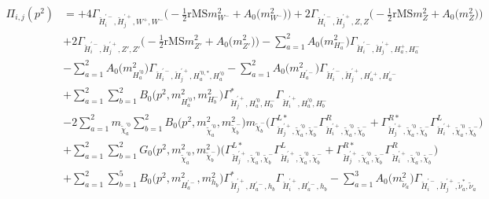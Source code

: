 \begin{itemize}
\begin{align} 
\Pi_{i,j}(p^2) &= +4 {\Gamma_{\check{H}^{'-}_{{i}},\check{H}^{'+}_{{j}},W^+,W^-}} \Big(-\frac{1}{2} \text{rMS} m^2_{W^-}  + {A_0\Big(m^2_{W^-}\Big)}\Big)+2 {\Gamma_{\check{H}^{'-}_{{i}},\check{H}^{'+}_{{j}},Z,Z}} \Big(-\frac{1}{2} \text{rMS} m^2_{Z}  + {A_0\Big(m^2_{Z}\Big)}\Big)\nonumber \\ 
 &+2 {\Gamma_{\check{H}^{'-}_{{i}},\check{H}^{'+}_{{j}},{Z'},{Z'}}} \Big(-\frac{1}{2} \text{rMS} m^2_{{Z'}}  + {A_0\Big(m^2_{{Z'}}\Big)}\Big)- \sum_{a=1}^{2}{A_0\Big(m^2_{H^-_{{a}}}\Big)} {\Gamma_{\check{H}^{'-}_{{i}},\check{H}^{'+}_{{j}},H^+_{{a}},H^-_{{a}}}}  \nonumber \\ 
 &- \sum_{a=1}^{2}{A_0\Big(m^2_{H^{'0}_{{a}}}\Big)} {\Gamma_{\check{H}^{'-}_{{i}},\check{H}^{'+}_{{j}},H^{{'0},*}_{{a}},H^{'0}_{{a}}}}  - \sum_{a=1}^{2}{A_0\Big(m^2_{H^{'-}_{{a}}}\Big)} {\Gamma_{\check{H}^{'-}_{{i}},\check{H}^{'+}_{{j}},H^{'+}_{{a}},H^{'-}_{{a}}}}  \nonumber \\ 
 &+\sum_{a=1}^{2}\sum_{b=1}^{2}{B_0\Big(p^{2},m^2_{H^{'0}_{{a}}},m^2_{H^-_{{b}}}\Big)} {\Gamma^*_{\check{H}^{'+}_{{j}},H^{'0}_{{a}},H^-_{{b}}}} {\Gamma_{\check{H}^{'+}_{{i}},H^{'0}_{{a}},H^-_{{b}}}} \nonumber \\ 
 &-2 \sum_{a=1}^{2}m_{\tilde{\chi}^{'0}_{{a}}} \sum_{b=1}^{2}{B_0\Big(p^{2},m^2_{\tilde{\chi}^{'0}_{{a}}},m^2_{\tilde{\chi}^-_{{b}}}\Big)} m_{\tilde{\chi}^-_{{b}}} \Big({\Gamma^{L*}_{\check{H}^{'+}_{{j}},\tilde{\chi}^{'0}_{{a}},\tilde{\chi}^-_{{b}}}} {\Gamma^R_{\check{H}^{'+}_{{i}},\tilde{\chi}^{'0}_{{a}},\tilde{\chi}^-_{{b}}}}  + {\Gamma^{R*}_{\check{H}^{'+}_{{j}},\tilde{\chi}^{'0}_{{a}},\tilde{\chi}^-_{{b}}}} {\Gamma^L_{\check{H}^{'+}_{{i}},\tilde{\chi}^{'0}_{{a}},\tilde{\chi}^-_{{b}}}} \Big)  \nonumber \\ 
 &+\sum_{a=1}^{2}\sum_{b=1}^{2}{G_0\Big(p^{2},m^2_{\tilde{\chi}^{'0}_{{a}}},m^2_{\tilde{\chi}^-_{{b}}}\Big)} \Big({\Gamma^{L*}_{\check{H}^{'+}_{{j}},\tilde{\chi}^{'0}_{{a}},\tilde{\chi}^-_{{b}}}} {\Gamma^L_{\check{H}^{'+}_{{i}},\tilde{\chi}^{'0}_{{a}},\tilde{\chi}^-_{{b}}}}  + {\Gamma^{R*}_{\check{H}^{'+}_{{j}},\tilde{\chi}^{'0}_{{a}},\tilde{\chi}^-_{{b}}}} {\Gamma^R_{\check{H}^{'+}_{{i}},\tilde{\chi}^{'0}_{{a}},\tilde{\chi}^-_{{b}}}} \Big)\nonumber \\ 
 &+\sum_{a=1}^{2}\sum_{b=1}^{5}{B_0\Big(p^{2},m^2_{H^{'-}_{{a}}},m^2_{h_{{b}}}\Big)} {\Gamma^*_{\check{H}^{'+}_{{j}},H^{'-}_{{a}},h_{{b}}}} {\Gamma_{\check{H}^{'+}_{{i}},H^{'-}_{{a}},h_{{b}}}} - \sum_{a=1}^{3}{A_0\Big(m^2_{\tilde{\nu}_{{a}}}\Big)} {\Gamma_{\check{H}^{'-}_{{i}},\check{H}^{'+}_{{j}},\tilde{\nu}^*_{{a}},\tilde{\nu}_{{a}}}}  \nonumber \\ 

\end{align}
\end{itemize}
